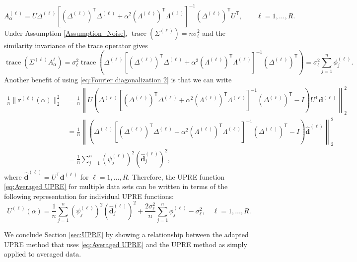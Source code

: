 \documentclass[12pt]{article}
\newcommand{\dVec}{\mathbf{d}}	%
\newcommand{\rVec}{\mathbf{r}}	%
\newcommand{\trans}[1]{{#1}^\mathsf{T}}	%
\DeclareMathOperator{\trace}{trace}		%
\newcommand{\dft}[1]{\widehat{#1}}	%
\newcommand{\regparam}{\alpha}  %
\newcommand{\filt}{\phi}
\newcommand{\mfilt}{\psi}
\newcommand{\noiseSD}{\sigma}	%
\newcommand{\A}{A_{\regparam}}	%
\newcommand{\U}{U}	%
\begin{document}
\begin{equation}
\label{eq:Fourier diagonalization 2}
\A^{(\ell)} = U\Delta^{(\ell)}\left[\trans{(\Delta^{(\ell)})}\Delta^{(\ell)} + \regparam^2\trans{(\Lambda^{(\ell)})}\Lambda^{(\ell)}\right]^{-1}\trans{(\Delta^{(\ell)})}\trans{U}, \qquad \ell = 1,\ldots,R.
\end{equation}
Under Assumption \ref{Assumption_Noise}, $\trace(\Sigma^{(\ell)}) = n\noiseSD^2_\ell$ and the similarity invariance of the trace operator gives
\begin{equation}
\label{eq:Trace}
\trace\left(\Sigma^{(\ell)}\A^{\ell}\right) = \noiseSD_\ell^2 \trace\left(\Delta^{(\ell)}\left[\trans{(\Delta^{(\ell)})}\Delta^{(\ell)} + \regparam^2\trans{(\Lambda^{(\ell)})}\Lambda^{(\ell)}\right]^{-1}\trans{(\Delta^{(\ell)})}\right) = \noiseSD_\ell^2 \sum_{j=1}^{n} \filt^{(\ell)}_j.
\end{equation}
Another benefit of using \eqref{eq:Fourier diagonalization 2} is that we can write
\begin{align}
\frac{1}{n}\|\rVec^{(\ell)}(\regparam)\|_2^2 &= \frac{1}{n}\left\|U\left(\Delta^{(\ell)}\left[\trans{(\Delta^{(\ell)})}\Delta^{(\ell)} + \regparam^2\trans{(\Lambda^{(\ell)})}\Lambda^{(\ell)}\right]^{-1}\trans{(\Delta^{(\ell)})} - I\right)\trans{U}\dVec^{(\ell)}\right\|_2^2 \nonumber \\
&= \frac{1}{n}\left\|\left(\Delta^{(\ell)}\left[\trans{(\Delta^{(\ell)})}\Delta^{(\ell)} + \regparam^2\trans{(\Lambda^{(\ell)})}\Lambda^{(\ell)}\right]^{-1}\trans{(\Delta^{(\ell)})} - I\right)\dft{\dVec}^{(\ell)}\right\|_2^2 \nonumber \\
&= \frac{1}{n}\sum_{j=1}^{n} \left(\mfilt^{(\ell)}_j\right)^2\left(\dft{\dVec}_j^{(\ell)}\right)^2,
\label{eq:Fourier regularized residual}
\end{align}
where $\dft{\dVec}^{(\ell)} = \trans{U}\dVec^{(\ell)}$ for $\ell = 1,\ldots,R$. Therefore, the UPRE function \eqref{eq:Averaged UPRE} for multiple data sets can be written in terms of the following representation for individual UPRE functions:
\begin{equation}
\label{eq:Individual UPRE 2}
\U^{(\ell)}(\regparam) = \frac{1}{n} \sum_{j=1}^{n} \left(\mfilt^{(\ell)}_j\right)^2\left(\dft{\dVec}_j^{(\ell)}\right)^2 + \frac{2\noiseSD^2_\ell}{n} \sum_{j=1}^{n} \filt^{(\ell)}_j - \noiseSD^2_\ell, \quad \ell = 1,\ldots,R.
\end{equation}

We conclude Section \ref{sec:UPRE} by showing a relationship between the adapted UPRE method that uses \eqref{eq:Averaged UPRE} and the UPRE method as simply applied to averaged data. 
\end{document}
